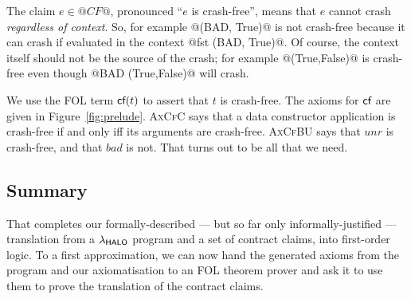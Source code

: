 The claim $e \in @CF@$, pronounced ``$e$ is crash-free'', means that $e$ cannot
crash \emph{regardless of context}.  So, for example @(BAD, True)@ is not crash-free
because it can crash if evaluated in the context @fst (BAD, True)@.  Of course,
the context itself should not be the source of the crash; for example @(True,False)@ is
crash-free even though @BAD (True,False)@ will crash.

We use the FOL term $\textsf{cf}(t)$ to assert that $t$ is crash-free. The axioms for $\textsf{cf}$
are given in Figure~\ref{fig:prelude}.  \textsc{AxCfC} says that a data constructor application
is crash-free if and only iff its arguments are crash-free.  \textsc{AxCfBU} says that
$unr$ is crash-free, and that $bad$ is not.  That turns out to be all that we need.

\subsection{Summary}

That completes our formally-described --- but so far only informally-justified --- translation
from a $\lambda_{\sf HALO}$ program and a set of contract claims, into first-order logic.
To a first approximation, we can now hand the generated axioms from the program and
our axiomatisation to an FOL theorem prover and ask it to use them to prove the 
translation of the contract claims. 


